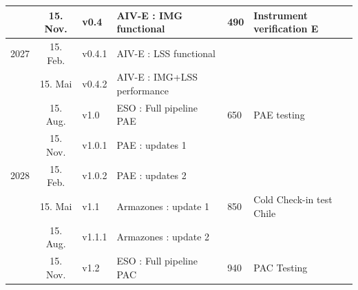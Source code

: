 \documentclass[a4paper]{spie}  %
\begin{document}
\begin{table}[]
\begin{tabular}{|lcllll|}
                                  & 15. Nov.      & v0.4             & AIV-E : IMG functional         & {490}                & Instrument verification E            \\
\hline
{2027}          & 15. Feb.      & v0.4.1           & AIV-E : LSS functional      &                                        &                                      \\
                                  & 15. Mai       & v0.4.2           & AIV-E : IMG+LSS performance   &                                        &                                      \\
                                  & 15. Aug.      & v1.0             & ESO : Full pipeline PAE         & {650}                & PAE testing                          \\
                                  & 15. Nov.      & v1.0.1           & PAE : updates 1              &                                        &                                      \\
\hline
{2028}          & 15. Feb.      & v1.0.2           & PAE : updates 2               &                                        &                                      \\
                                  & 15. Mai       & v1.1             & Armazones : update 1           & {850}                & Cold Check-in test Chile             \\
                                  & 15. Aug.      & v1.1.1           &Armazones : update 2          &                                        &                                      \\
                                  & 15. Nov.      & v1.2             & ESO : Full pipeline PAC         & {940}                & PAC Testing       \\         
\hline
\end{tabular}
\end{table}
\end{document}
